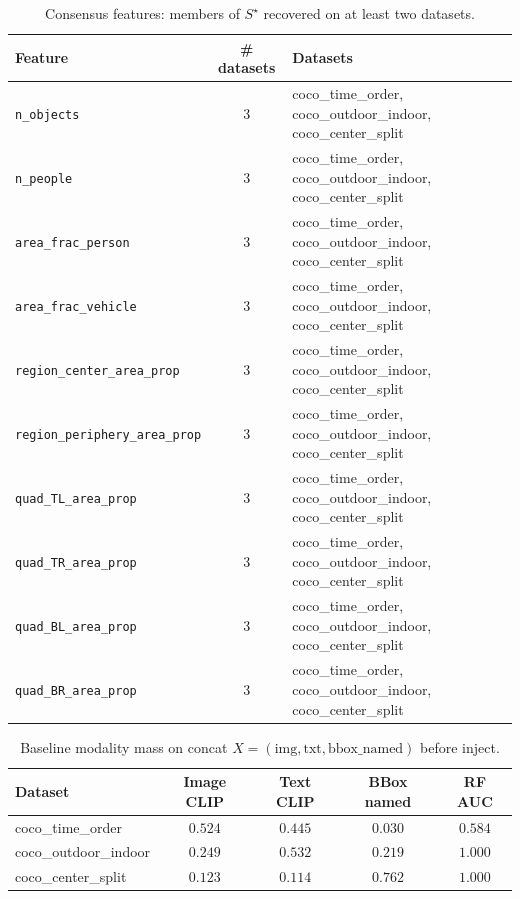 \begin{table}[ht]
\centering
\caption{Consensus features: members of $S^{\star}$ recovered on at least two datasets.}
\label{tab:bbox-named-consensus-features}
\small
\begin{tabular}{@{}l c l@{}}
\toprule
Feature & \# datasets & Datasets \\
\midrule
\texttt{n\_objects} & 3 & coco\_time\_order, coco\_outdoor\_indoor, coco\_center\_split \\
\texttt{n\_people} & 3 & coco\_time\_order, coco\_outdoor\_indoor, coco\_center\_split \\
\texttt{area\_frac\_person} & 3 & coco\_time\_order, coco\_outdoor\_indoor, coco\_center\_split \\
\texttt{area\_frac\_vehicle} & 3 & coco\_time\_order, coco\_outdoor\_indoor, coco\_center\_split \\
\texttt{region\_center\_area\_prop} & 3 & coco\_time\_order, coco\_outdoor\_indoor, coco\_center\_split \\
\texttt{region\_periphery\_area\_prop} & 3 & coco\_time\_order, coco\_outdoor\_indoor, coco\_center\_split \\
\texttt{quad\_TL\_area\_prop} & 3 & coco\_time\_order, coco\_outdoor\_indoor, coco\_center\_split \\
\texttt{quad\_TR\_area\_prop} & 3 & coco\_time\_order, coco\_outdoor\_indoor, coco\_center\_split \\
\texttt{quad\_BL\_area\_prop} & 3 & coco\_time\_order, coco\_outdoor\_indoor, coco\_center\_split \\
\texttt{quad\_BR\_area\_prop} & 3 & coco\_time\_order, coco\_outdoor\_indoor, coco\_center\_split \\
\bottomrule
\end{tabular}
\end{table}

\begin{table}[ht]
\centering
\caption{Baseline modality mass on concat $X=(\mathrm{img},\mathrm{txt},\mathrm{bbox\_named})$ before inject.}
\label{tab:bbox-named-baseline-mass}
\small
\begin{tabular}{@{}l cccc@{}}
\toprule
Dataset & Image CLIP & Text CLIP & BBox named & RF AUC \\
\midrule
coco\_time\_order & $0.524$ & $0.445$ & $0.030$ & $0.584$ \\
coco\_outdoor\_indoor & $0.249$ & $0.532$ & $0.219$ & $1.000$ \\
coco\_center\_split & $0.123$ & $0.114$ & $0.762$ & $1.000$ \\
\bottomrule
\end{tabular}
\end{table}

